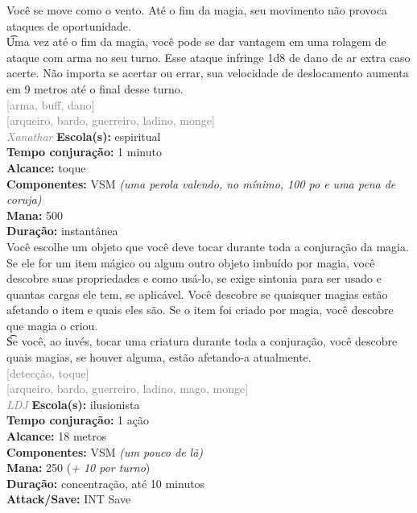 \documentclass{RPG_Adventure}[2021/10/20]
\begin{document}
{\normalsize Você se move como o vento. Até o fim da magia, seu movimento não provoca ataques de oportunidade.\\\t Uma vez até o fim da magia, você pode se dar vantagem em uma rolagem de ataque com arma no seu turno. Esse ataque infringe 1d8 de dano de ar extra caso acerte. Não importa se acertar ou errar, sua velocidade de deslocamento aumenta em 9 metros até o final desse turno.\\}
{\scriptsize \textcolor{gray}{[arma, buff, dano]\\}}
{\scriptsize \textcolor{gray}{[arqueiro, bardo, guerreiro, ladino, monge]\\}}
{\tiny \textcolor{gray}{\textit{Xanathar}}}\jump{}
{\small \t \textbf{Escola(s):} espiritual\\\t \textbf{Tempo conjuração:} 1 minuto\\\t \textbf{Alcance:} toque\\\t \textbf{Componentes:} VSM \textit{(uma perola valendo, no mínimo, 100 po e uma pena de coruja)}\\\t \textbf{Mana:} 500\\\t \textbf{Duração:} instantânea\\}
{\normalsize Você escolhe um objeto que você deve tocar durante toda a conjuração da magia. Se ele for um item mágico ou algum outro objeto imbuído por magia, você descobre suas propriedades e como usá-lo, se exige sintonia para ser usado e quantas cargas ele tem, se aplicável. Você descobre se quaisquer magias estão afetando o item e quais eles são. Se o item foi criado por magia, você descobre que magia o criou.  \\\t Se você, ao invés, tocar uma criatura durante toda a conjuração, você descobre quais magias, se houver alguma, estão afetando-a atualmente.\\}
{\scriptsize \textcolor{gray}{[detecção, toque]\\}}
{\scriptsize \textcolor{gray}{[arqueiro, bardo, guerreiro, ladino, mago, monge]\\}}
{\tiny \textcolor{gray}{\textit{LDJ}}}\jump{}
{\small \t \textbf{Escola(s):} ilusionista\\\t \textbf{Tempo conjuração:} 1 ação\\\t \textbf{Alcance:} 18 metros\\\t \textbf{Componentes:} VSM \textit{(um pouco de lã)}\\\t \textbf{Mana:} 250 (\textit{+ 10 por turno})\\\t \textbf{Duração:} concentração, até 10 minutos\\\t \textbf{Attack/Save:} INT Save\\}
\end{document}
